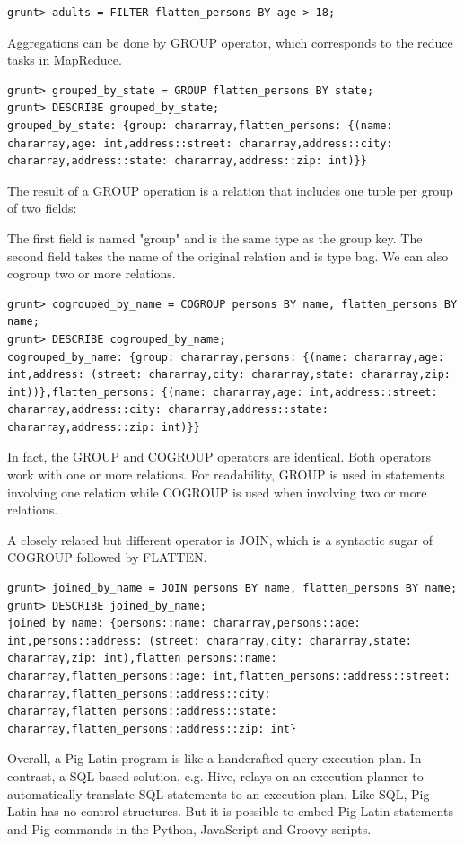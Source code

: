 \documentclass[11pt]{book}
\begin{document}
\begin{lstlisting}
grunt> adults = FILTER flatten_persons BY age > 18;
\end{lstlisting}
Aggregations can be done by GROUP operator, which corresponds to the reduce tasks in MapReduce.

\begin{lstlisting}
grunt> grouped_by_state = GROUP flatten_persons BY state;
grunt> DESCRIBE grouped_by_state;
grouped_by_state: {group: chararray,flatten_persons: {(name: chararray,age: int,address::street: chararray,address::city: chararray,address::state: chararray,address::zip: int)}}
\end{lstlisting}
The result of a GROUP operation is a relation that includes one tuple per group of two fields:

The first field is named "group" and is the same type as the group key.
The second field takes the name of the original relation and is type bag.
We can also cogroup two or more relations.

\begin{lstlisting}
grunt> cogrouped_by_name = COGROUP persons BY name, flatten_persons BY name;
grunt> DESCRIBE cogrouped_by_name;
cogrouped_by_name: {group: chararray,persons: {(name: chararray,age: int,address: (street: chararray,city: chararray,state: chararray,zip: int))},flatten_persons: {(name: chararray,age: int,address::street: chararray,address::city: chararray,address::state: chararray,address::zip: int)}}
\end{lstlisting}
In fact, the GROUP and COGROUP operators are identical. Both operators work with one or more relations. For readability, GROUP is used in statements involving one relation while COGROUP is used when involving two or more relations.

A closely related but different operator is JOIN, which is a syntactic sugar of COGROUP followed by FLATTEN.

\begin{lstlisting}
grunt> joined_by_name = JOIN persons BY name, flatten_persons BY name;
grunt> DESCRIBE joined_by_name;
joined_by_name: {persons::name: chararray,persons::age: int,persons::address: (street: chararray,city: chararray,state: chararray,zip: int),flatten_persons::name: chararray,flatten_persons::age: int,flatten_persons::address::street: chararray,flatten_persons::address::city: chararray,flatten_persons::address::state: chararray,flatten_persons::address::zip: int}
\end{lstlisting}
Overall, a Pig Latin program is like a handcrafted query execution plan. In contrast, a SQL based solution, e.g. Hive, relays on an execution planner to automatically translate SQL statements to an execution plan. Like SQL, Pig Latin has no control structures. But it is possible to embed Pig Latin statements and Pig commands in the Python, JavaScript and Groovy scripts.
\end{document}
